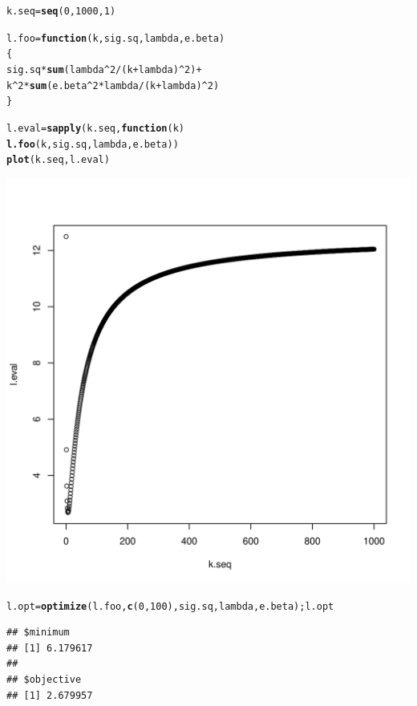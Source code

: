 \documentclass{article}\usepackage[]{graphicx}\usepackage[]{color}
\makeatletter
\def\maxwidth{ %
  \ifdim\Gin@nat@width>\linewidth
    \linewidth
  \else
    \Gin@nat@width
  \fi
}
\newcommand{\hlnum}[1]{\textcolor[rgb]{0.686,0.059,0.569}{#1}}%
\newcommand{\hlopt}[1]{\textcolor[rgb]{0,0,0}{#1}}%
\newcommand{\hlstd}[1]{\textcolor[rgb]{0.345,0.345,0.345}{#1}}%
\newcommand{\hlkwa}[1]{\textcolor[rgb]{0.161,0.373,0.58}{\textbf{#1}}}%
\newcommand{\hlkwb}[1]{\textcolor[rgb]{0.69,0.353,0.396}{#1}}%
\newcommand{\hlkwc}[1]{\textcolor[rgb]{0.333,0.667,0.333}{#1}}%
\newcommand{\hlkwd}[1]{\textcolor[rgb]{0.737,0.353,0.396}{\textbf{#1}}}%
\newenvironment{kframe}{%
 \def\at@end@of@kframe{}%
 \ifinner\ifhmode%
  \def\at@end@of@kframe{\end{minipage}}%
  \begin{minipage}{\columnwidth}%
 \fi\fi%
 \def\FrameCommand##1{\hskip\@totalleftmargin \hskip-\fboxsep
 \colorbox{shadecolor}{##1}\hskip-\fboxsep
     \hskip-\linewidth \hskip-\@totalleftmargin \hskip\columnwidth}%
 \MakeFramed {\advance\hsize-\width
   \@totalleftmargin\z@ \linewidth\hsize
   \@setminipage}}%
 {\par\unskip\endMakeFramed%
 \at@end@of@kframe}
\newenvironment{knitrout}{}{} %
\makeatother
\begin{document}
\begin{enumerate}[(a)]
\begin{knitrout}
\begin{kframe}
\begin{alltt}
\hlstd{k.seq} \hlkwb{=} \hlkwd{seq}\hlstd{(}\hlnum{0}\hlstd{,} \hlnum{1000}\hlstd{,} \hlnum{1}\hlstd{)}

\hlstd{l.foo} \hlkwb{=} \hlkwa{function}\hlstd{(}\hlkwc{k}\hlstd{,} \hlkwc{sig.sq}\hlstd{,} \hlkwc{lambda}\hlstd{,} \hlkwc{e.beta}\hlstd{)}
\hlstd{\{}
  \hlstd{sig.sq} \hlopt{*} \hlkwd{sum}\hlstd{( lambda}\hlopt{^}\hlnum{2} \hlopt{/} \hlstd{(k}\hlopt{+}\hlstd{lambda)}\hlopt{^}\hlnum{2} \hlstd{)} \hlopt{+}
    \hlstd{k}\hlopt{^}\hlnum{2} \hlopt{*} \hlkwd{sum}\hlstd{( e.beta}\hlopt{^}\hlnum{2}\hlopt{*}\hlstd{lambda} \hlopt{/} \hlstd{(k}\hlopt{+}\hlstd{lambda)}\hlopt{^}\hlnum{2} \hlstd{)}
\hlstd{\}}

\hlstd{l.eval} \hlkwb{=} \hlkwd{sapply}\hlstd{(k.seq,} \hlkwa{function}\hlstd{(}\hlkwc{k}\hlstd{)}
  \hlkwd{l.foo}\hlstd{(k, sig.sq, lambda, e.beta))}
\hlkwd{plot}\hlstd{(k.seq, l.eval)}
\end{alltt}
\end{kframe}
\includegraphics[width=\maxwidth]{figure/unnamed-chunk-11-1} 
\begin{kframe}\begin{alltt}
\hlstd{l.opt} \hlkwb{=} \hlkwd{optimize}\hlstd{(l.foo,} \hlkwd{c}\hlstd{(}\hlnum{0}\hlstd{,} \hlnum{100}\hlstd{), sig.sq, lambda, e.beta); l.opt}
\end{alltt}
\begin{verbatim}
## $minimum
## [1] 6.179617
## 
## $objective
## [1] 2.679957
\end{verbatim}
\end{kframe}
\end{knitrout}


\end{enumerate}
\end{document}
